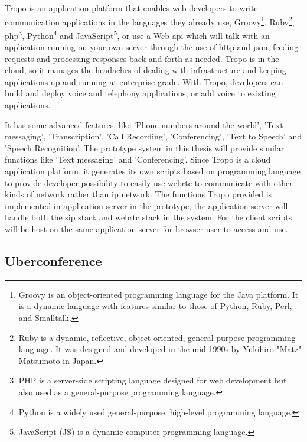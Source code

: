 \par Tropo is an application platform that enables web developers to write communication applications in the languages they already use, Groovy\footnote{Groovy is an object-oriented programming language for the Java platform. It is a dynamic language with features similar to those of Python, Ruby, Perl, and Smalltalk.\cite{wiki:groovy}}, Ruby\footnote{Ruby is a dynamic, reflective, object-oriented, general-purpose programming language. It was designed and developed in the mid-1990s by Yukihiro "Matz" Matsumoto in Japan.\cite{wiki:ruby}}, \gls{php}\footnote{PHP is a server-side scripting language designed for web development but also used as a general-purpose programming language.\cite{wiki:php}}, Python\footnote{Python is a widely used general-purpose, high-level programming language.\cite{wiki:python}} and JavaScript\footnote{JavaScript (JS) is a dynamic computer programming language.\cite{wiki:js}}, or use a Web \gls{api} which will talk with an application running on your own server through the use of \gls{http} and \gls{json}, feeding requests and processing responses back and forth as needed. Tropo is in the cloud, so it manages the headaches of dealing with infrastructure and keeping applications up and running at enterprise-grade. With Tropo, developers can build and deploy voice and telephony applications, or add voice to existing applications.\cite{web:tropo}

\par It has some advanced features, like 'Phone numbers around the world', 'Text messaging', 'Transcription', 'Call Recording', 'Conferencing', 'Text to Speech' and 'Speech Recognition'. The prototype system in this thesis will provide similar functions like 'Text messaging' and 'Conferencing'. Since Tropo is a cloud application platform, it generates its own scripts based on programming language to provide developer possibility to easily use \gls{webrtc} to communicate with other kinds of network rather than \gls{ip} network. The functions Tropo provided is implemented in application server in the prototype, the application server will handle both the \gls{sip} stack and \gls{webrtc} stack in the system. For the client scripts will be host on the same application server for browser user to access and use.

\subsection{Uberconference}

